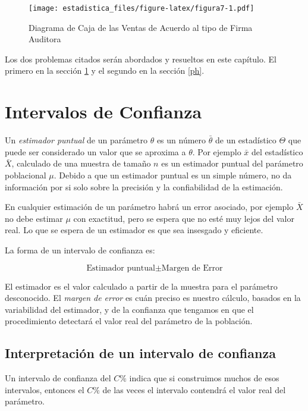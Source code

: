 \documentclass[]{book}
\begin{document}
\begin{figure}
\centering
\texttt{[image: estadistica\_files/figure-latex/figura7-1.pdf]}
\caption{\label{fig:figura7}Diagrama de Caja de las Ventas de Acuerdo al
tipo de Firma Auditora}
\end{figure}

Los dos problemas citados serán abordados y resueltos en este capítulo.
El primero en la sección \ref{ic} y el segundo en la sección \ref{ph}.

\section{Intervalos de Confianza}\label{ic}

Un \emph{estimador puntual} de un parámetro \(\theta\) es un número
\(\bar{\theta}\) de un estadístico \(\Theta\) que puede ser considerado
un valor que se aproxima a \(\theta\). Por ejemplo \(\bar{x}\) del
estadístico \(\bar{X}\), calculado de una muestra de tamaño \(n\) es un
estimador puntual del parámetro poblacional \(\mu\). Debido a que un
estimador puntual es un simple número, no da información por si solo
sobre la precisión y la confiabilidad de la estimación.

En cualquier estimación de un parámetro habrá un error asociado, por
ejemplo \(\bar{X}\) no debe estimar \(\mu\) con exactitud, pero se
espera que no esté muy lejos del valor real. Lo que se espera de un
estimador es que sea insesgado y eficiente.

La forma de un intervalo de confianza es:

\begin{equation} 
  \text{Estimador puntual} \pm \text{Margen de Error}
  \label{eq:ic}
\end{equation}

El estimador es el valor calculado a partir de la muestra para el
parámetro desconocido. El \emph{margen de error} es cuán preciso es
nuestro cálculo, basados en la variabilidad del estimador, y de la
confianza que tengamos en que el procedimiento detectará el valor real
del parámetro de la población.

\subsection{Interpretación de un intervalo de
confianza}\label{interpretacion-de-un-intervalo-de-confianza}

Un intervalo de confianza del \(C \%\) indica que si construimos muchos
de esos intervalos, entonces el \(C \%\) de las veces el intervalo
contendrá el valor real del parámetro.
\end{document}
